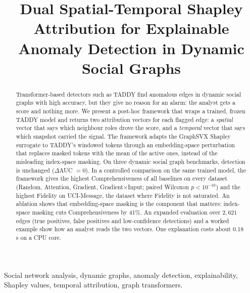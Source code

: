 \documentclass[conference]{IEEEtran}
\begin{document}
\title{Dual Spatial-Temporal Shapley Attribution for Explainable Anomaly Detection in Dynamic Social Graphs}

\author{
}

\maketitle

\begin{abstract}
Transformer-based detectors such as TADDY find anomalous edges in dynamic social
graphs with high accuracy, but they give no reason for an alarm: the analyst gets
a score and nothing more. We present a post-hoc framework that wraps a trained,
frozen TADDY model and returns two attribution vectors for each flagged edge: a
\emph{spatial} vector that says which neighbour roles drove the score, and a
\emph{temporal} vector that says which snapshot carried the signal. The framework
adapts the GraphSVX Shapley surrogate to TADDY's windowed tokens through an
embedding-space perturbation that replaces masked tokens with the mean of the
active ones, instead of the misleading index-space masking. On three dynamic
social graph benchmarks, detection is unchanged ($\Delta$AUC $=0$). In a
controlled comparison on the same trained model, the framework gives the highest
Comprehensiveness of all baselines on every dataset (Random, Attention, Gradient,
Gradient$\times$Input; paired Wilcoxon $p<10^{-10}$) and the highest Fidelity on
UCI-Message, the dataset where Fidelity is not saturated. An ablation shows that
embedding-space masking is the component that matters: index-space masking cuts
Comprehensiveness by 41\%. An expanded evaluation over $2{,}621$ edges (true
positives, false positives and low-confidence detections) and a worked example
show how an analyst reads the two vectors. One explanation costs about 0.18\,s
on a CPU core.
\end{abstract}

\begin{IEEEkeywords}
Social network analysis, dynamic graphs, anomaly detection, explainability,
Shapley values, temporal attribution, graph transformers.
\end{IEEEkeywords}
\end{document}
